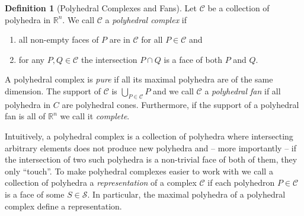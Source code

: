 \documentclass[
  paper=a4,
  titlepage,
  bibliography=totoc,
  pagesize=pdftex
]{scrartcl}
\numberwithin{figure}{section}
\numberwithin{equation}{section}
\numberwithin{table}{section}
\newcommand*\setR{\mathds{R}}
\theoremstyle{definition}
\newtheorem{definition}{Definition}
\numberwithin{definition}{section}
\begin{document}
\begin{definition}[Polyhedral Complexes and Fans]
  \label{def:polyhedralFan}
  Let $\mathcal C$ be a collection of polyhedra in $\setR^n$. We call $\mathcal C$ a
  \emph{polyhedral complex} if
  \begin{enumerate}
    \item all non-empty faces of $P$ are in $\mathcal C$ for all $P \in \mathcal C$ and
    \item for any $P,Q \in \mathcal C$ the intersection $P\cap Q$ is a face of both $P$
      and $Q$.
  \end{enumerate}
  A polyhedral complex is \emph{pure} if all its maximal polyhedra are of the same
  dimension. The support of $\mathcal C$ is $\bigcup_{P\in\mathcal C}P$ and we call
  $\mathcal C$ a \emph{polyhedral fan} if all polyhedra in $C$ are polyhedral cones.
  Furthermore, if the support of a polyhedral fan is all of $\setR^n$ we call it
  \emph{complete}.
\end{definition}

Intuitively, a polyhedral complex is a collection of polyhedra where intersecting
arbitrary elements does not produce new polyhedra and -- more importantly -- if the
intersection of two such polyhedra is a non-trivial face of both of them, they only
\enquote{touch}. To make polyhedral complexes easier to work with we call a collection of
polyhedra a \emph{representation} of a complex $\mathcal C$ if each polyhedron $P \in
\mathcal C$ is a face of some $S \in \mathcal S$. In particular, the maximal polyhedra of
a polyhedral complex define a representation.
\end{document}

